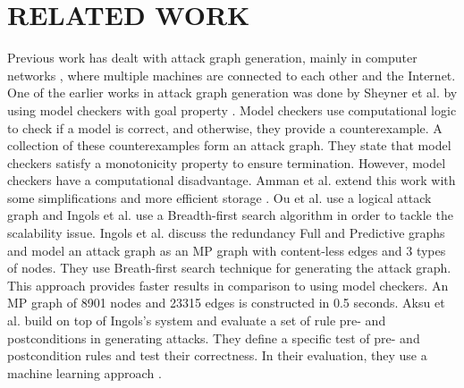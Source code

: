 \section{RELATED WORK}
\label{chap:related_work}

Previous work has dealt with attack graph generation, mainly in computer networks \cite{ingols2006practical, sheyner2002automated, ritchey2000using, ou2006scalable}, where multiple machines are connected to each other and the Internet. %
One of the earlier works in attack graph generation was done by Sheyner et al. by using model checkers with goal property \cite{sheyner2002automated}. Model checkers use computational logic to check if a model is correct, and otherwise, they provide a counterexample. A collection of these counterexamples form an attack graph. They state that model checkers satisfy a monotonicity property  to ensure termination. However, model checkers have a computational disadvantage. %
 Amman et al. extend this work with some simplifications and more efficient storage \cite{ritchey2000using}. Ou et al. use a logical attack graph \cite{ou2006scalable} and Ingols \cite{ingols2006practical} et al. use a Breadth-first search algorithm in order to tackle the scalability issue. Ingols et al. discuss the redundancy Full and Predictive graphs and model an attack graph as an MP graph with content-less edges and 3 types of nodes. They use Breath-first search technique for generating the attack graph. This approach provides faster results in comparison to using model checkers. An MP graph of 8901 nodes and 23315 edges is constructed in 0.5 seconds. Aksu et al. build on top of Ingols's system and evaluate a set of rule pre- and postconditions in generating attacks. They define a specific test of pre- and postcondition rules and test their correctness. In their evaluation, they use a machine learning approach \cite{aksu2018automated}.

